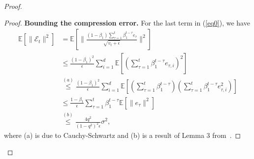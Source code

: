\documentclass[11pt]{article}
\begin{document}
\begin{proof}
\begin{proof}
\textbf{Bounding the compression error.} For the last term in (\ref{eq0}), we have
\begin{align*}
    \mathbb E[\|\mathcal E_t\|^2]&=\mathbb E[\|\frac{(1-\beta_1)\sum_{\tau=1}^t\beta_1^{t-\tau} e_\tau}{\sqrt{\hat v_t+\epsilon}}\|^2]\\
    &\leq \frac{(1-\beta_1)^2}{\epsilon}\sum_{i=1}^d \mathbb E[(\sum_{\tau=1}^t\beta_1^{t-\tau} e_{\tau,i})^2]\\
    &\overset{(a)}{\leq} \frac{(1-\beta_1)^2}{\epsilon}\sum_{i=1}^d \mathbb E[(\sum_{\tau=1}^t\beta_1^{t-\tau})(\sum_{\tau=1}^t\beta_1^{t-\tau} e_{\tau,i}^2)]\\
    &\leq \frac{1-\beta_1}{\epsilon}\sum_{\tau=1}^t \beta_1^{t-\tau}\mathbb E[\|e_\tau\|^2]\\
    &\overset{(b)}{\leq} \frac{4q^2}{(1-q^2)^2\epsilon}\sigma^2,
\end{align*}
where (a) is due to Cauchy-Schwartz and (b) is a result of Lemma 3 from~\cite{karimireddy2019error}.


\end{proof}
\end{proof}
\end{document}
